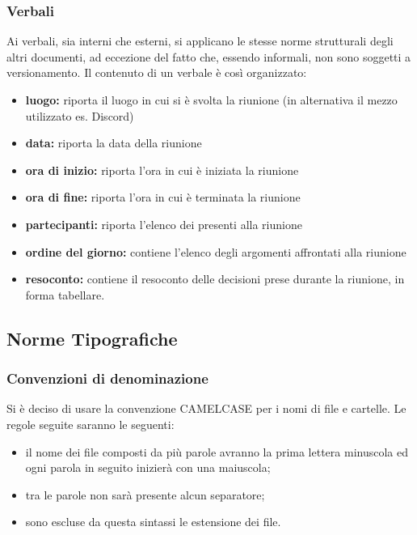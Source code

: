 \subsubsection{Verbali}
Ai verbali, sia interni che esterni, si applicano le stesse norme strutturali degli altri documenti, ad eccezione del fatto che, essendo informali, non sono soggetti a versionamento. Il contenuto di un verbale è così organizzato:
\begin{itemize}
\item \textbf{luogo:} riporta il luogo in cui si è svolta la riunione (in alternativa il mezzo utilizzato es. Discord)
	\item \textbf{data:} riporta la data della riunione
		\item \textbf{ora di inizio:} riporta l'ora in cui è iniziata la riunione
			\item \textbf{ora di fine:} riporta l'ora in cui è terminata la riunione
				\item \textbf{partecipanti:} riporta l'elenco dei presenti alla riunione
					\item \textbf{ordine del giorno:} contiene l'elenco degli argomenti affrontati alla riunione
						\item \textbf{resoconto:}  contiene il resoconto delle decisioni prese durante la riunione, in forma tabellare.	
\end{itemize}
\subsection{Norme Tipografiche}
\subsubsection{Convenzioni di denominazione}
Si è deciso di usare la convenzione CAMELCASE per i nomi di file e cartelle. Le regole seguite saranno le seguenti:
\begin{itemize}
\item il nome dei file composti da più parole avranno la prima lettera minuscola ed ogni parola in seguito inizierà con una maiuscola; 
	\item tra le parole non sarà presente alcun separatore; 
		\item sono escluse da questa sintassi le estensione dei file. 
\end{itemize}

